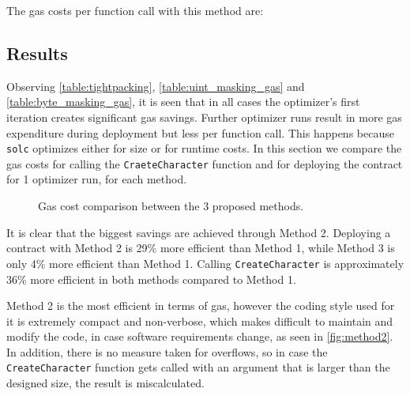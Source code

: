 The gas costs per function call with this method are: 


\subsection{Results}\label{ch:scalability:results}
Observing \ref{table:tightpacking}, \ref{table:uint_masking_gas} and \ref{table:byte_masking_gas},  it is seen that in all cases the optimizer's first iteration creates significant gas savings. Further optimizer runs result in more gas expenditure during deployment but less per function call. This happens because \texttt{solc} optimizes either for size or for runtime costs\cite{optimizer-tradeoff}. In this section we compare the gas costs for calling the \texttt{CraeteCharacter} function and for deploying the contract for 1 optimizer run, for each method.

\begin{figure}[ht!]
    \caption{Gas cost comparison between the 3 proposed methods.}
    \label{fig:gascomp}
\end{figure}

It is clear that the biggest savings are achieved through Method 2. Deploying a contract with Method 2 is 29\% more efficient than Method 1, while Method 3 is only 4\% more efficient than Method 1. Calling \texttt{CreateCharacter} is approximately 36\% more efficient in both methods compared to Method 1. 

Method 2 is the most efficient in terms of gas, however the coding style used for it is extremely compact and non-verbose, which makes difficult to maintain and modify the code, in case software requirements change, as seen in \ref{fig:method2}. In addition, there is no measure taken for overflows, so in case the \texttt{CreateCharacter} function gets called with an argument that is larger than the designed size, the result is miscalculated. 


